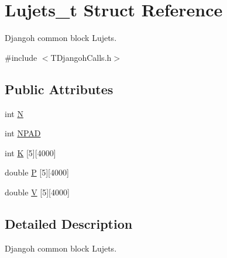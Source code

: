\hypertarget{struct_lujets__t}{\section{Lujets\+\_\+t Struct Reference}
\label{struct_lujets__t}
}


Djangoh common block Lujets.  




{\ttfamily \#include $<$T\+Djangoh\+Calls.\+h$>$}

\subsection*{Public Attributes}
\begin{DoxyCompactItemize}
\item 
int \hyperlink{struct_lujets__t_a17571954fa27f93e7a5bdaf763057547}{N}
\item 
int \hyperlink{struct_lujets__t_a9bfadb28d8093e469dfed54f7df5b80e}{N\+P\+A\+D}
\item 
int \hyperlink{struct_lujets__t_ad8aaaaff1a45805c18b56154446bdf16}{K} \mbox{[}5\mbox{]}\mbox{[}4000\mbox{]}
\item 
double \hyperlink{struct_lujets__t_aec85d7058f39ff74657d6d7f8ef54d21}{P} \mbox{[}5\mbox{]}\mbox{[}4000\mbox{]}
\item 
double \hyperlink{struct_lujets__t_a0a2bde586f224cda7072d27ed5df78f5}{V} \mbox{[}5\mbox{]}\mbox{[}4000\mbox{]}
\end{DoxyCompactItemize}


\subsection{Detailed Description}
Djangoh common block Lujets. 

